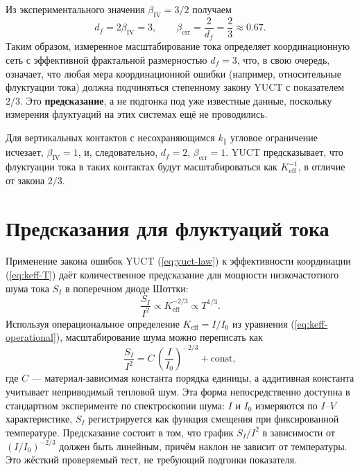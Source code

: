 \documentclass[12pt,a4paper]{article}
\newcommand{\Keff}{K_{\mathrm{eff}}}
\begin{document}
	Из экспериментального значения $\beta_{\mathrm{IV}} = 3/2$ получаем
	\begin{equation}
		d_f = 2\beta_{\mathrm{IV}} = 3, \qquad
		\beta_{\mathrm{err}} = \frac{2}{d_f} = \frac{2}{3} \approx 0.67.
	\end{equation}
	Таким образом, измеренное масштабирование тока определяет координационную
	сеть с эффективной фрактальной размерностью $d_f = 3$, что, в свою очередь,
	означает, что любая мера координационной ошибки (например, относительные
	флуктуации тока) должна подчиняться степенному закону YUCT с показателем
	$2/3$. Это \textbf{предсказание}, а не подгонка под уже известные данные,
	поскольку измерения флуктуаций на этих системах ещё не проводились.
	
	Для вертикальных контактов с несохраняющимся $k_\parallel$ угловое
	ограничение исчезает, $\beta_{\mathrm{IV}} = 1$, и, следовательно,
	$d_f = 2$, $\beta_{\mathrm{err}} = 1$. YUCT предсказывает, что флуктуации
	тока в таких контактах будут масштабироваться как $\Keff^{-1}$, в отличие
	от закона $2/3$.
	
	\section{Предсказания для флуктуаций тока}
	\label{sec:predictions}
	Применение закона ошибок YUCT (\ref{eq:yuct-law}) к эффективности
	координации (\ref{eq:keff-T}) даёт количественное предсказание для
	мощности низкочастотного шума тока $S_I$ в поперечном диоде Шоттки:
	\begin{equation}
		\frac{S_I}{I^2} \propto \Keff^{-2/3} \propto T^{1/3}.
		\label{eq:noise-pred}
	\end{equation}
	Используя операциональное определение $\Keff = I/I_0$ из
	уравнения (\ref{eq:keff-operational}), масштабирование шума можно переписать как
	\begin{equation}
		\frac{S_I}{I^2} = C \, \left(\frac{I}{I_0}\right)^{-2/3} + \text{const},
		\label{eq:noise-operational}
	\end{equation}
	где $C$ — материал-зависимая константа порядка единицы, а аддитивная
	константа учитывает неприводимый тепловой шум. Эта форма непосредственно
	доступна в стандартном эксперименте по спектроскопии шума: $I$ и $I_0$
	измеряются по $I$–$V$ характеристике, $S_I$ регистрируется как функция
	смещения при фиксированной температуре. Предсказание состоит в том, что
	график $S_I/I^2$ в зависимости от $(I/I_0)^{-2/3}$ должен быть линейным,
	причём наклон не зависит от температуры. Это жёсткий проверяемый тест,
	не требующий подгонки показателя.
	
\end{document}
